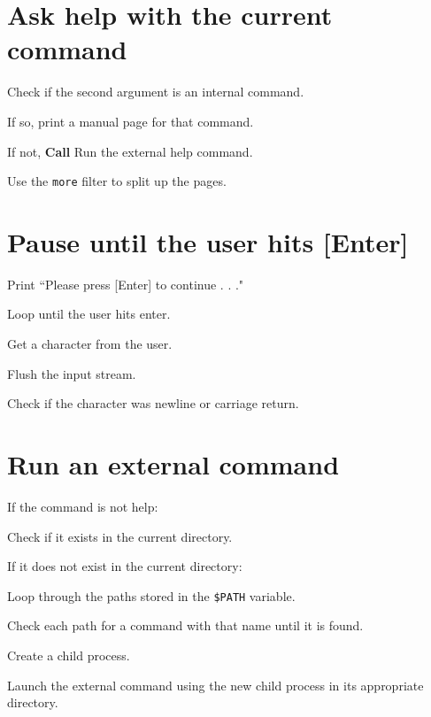 \documentclass{article}
\begin{document}
\section{Ask help with the current command}
\begin{deepenum}
    \item
        Check if the second argument is an internal command.
        \begin{deepenum}
            \item
                If so, print a manual page for that command.
            \item
                If not, \textbf{Call} Run the external help command.
        \end{deepenum}
    \item
        Use the \texttt{more} filter to split up the pages.
\end{deepenum}

\section{Pause until the user hits [Enter]}
\begin{deepenum}
    \item
        Print ``Please press [Enter] to continue . . ."
    \item
        Loop until the user hits enter.
        \begin{deepenum}
            \item Get a character from the user.
            \item Flush the input stream.
            \item Check if the character was newline or carriage return.
        \end{deepenum}
\end{deepenum}

\section{Run an external command}
\begin{deepenum}
    \item
        If the command is not help:
        \begin{deepenum}
            \item
                Check if it exists in the current directory.
            \item
                If it does not exist in the current directory:
                \begin{deepenum}
                    \item
                        Loop through the paths stored in the \texttt{\$PATH} variable.
                    \item
                        Check each path for a command with that name until it is found.
                \end{deepenum}
        \end{deepenum}
    \item
        Create a child process.
    \item
        Launch the external command using the new child process in its appropriate directory.
\end{deepenum}
\end{document}
